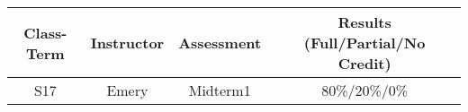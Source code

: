 \begin{outcomes}
\begin{center}
	\begin{tabular}{cccc}
		\hline\hline
                Class-Term & Instructor & Assessment & Results (Full/Partial/No Credit) \\
		\hline
                S17 & Emery & Midterm1 & 80\%/20\%/0\%\\
		\hline
	\end{tabular}
\end{center}
\end{outcomes}

\begin{comments}


\end{comments}